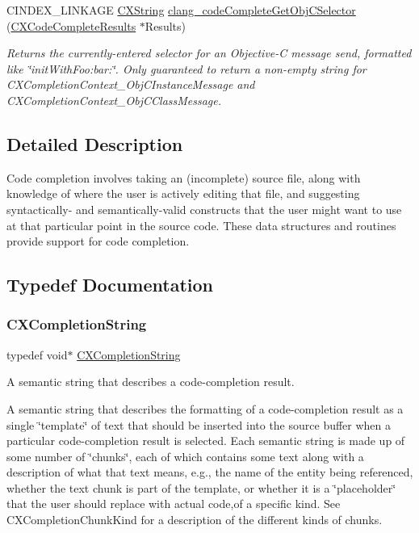 \begin{DoxyCompactItemize}
C\+I\+N\+D\+E\+X\+\_\+\+L\+I\+N\+K\+A\+GE \hyperlink{structCXString}{C\+X\+String} \hyperlink{group__CINDEX__CODE__COMPLET_gad03e82d61a1e6cdb78538bf61823aa11}{clang\+\_\+code\+Complete\+Get\+Obj\+C\+Selector} (\hyperlink{structCXCodeCompleteResults}{C\+X\+Code\+Complete\+Results} $\ast$Results)
\begin{DoxyCompactList}\small\item\em Returns the currently-\/entered selector for an Objective-\/C message send, formatted like \char`\"{}init\+With\+Foo\+:bar\+:\char`\"{}. Only guaranteed to return a non-\/empty string for C\+X\+Completion\+Context\+\_\+\+Obj\+C\+Instance\+Message and C\+X\+Completion\+Context\+\_\+\+Obj\+C\+Class\+Message. \end{DoxyCompactList}\end{DoxyCompactItemize}


\subsection{Detailed Description}
Code completion involves taking an (incomplete) source file, along with knowledge of where the user is actively editing that file, and suggesting syntactically-\/ and semantically-\/valid constructs that the user might want to use at that particular point in the source code. These data structures and routines provide support for code completion. 

\subsection{Typedef Documentation}
\mbox{\label{group__CINDEX__CODE__COMPLET_gafea23a43a60ec3b4f3bedccfbb76883a}} 
\subsubsection{\texorpdfstring{C\+X\+Completion\+String}{CXCompletionString}}
{\footnotesize\ttfamily typedef void$\ast$ \hyperlink{group__CINDEX__CODE__COMPLET_gafea23a43a60ec3b4f3bedccfbb76883a}{C\+X\+Completion\+String}}



A semantic string that describes a code-\/completion result. 

A semantic string that describes the formatting of a code-\/completion result as a single \char`\"{}template\char`\"{} of text that should be inserted into the source buffer when a particular code-\/completion result is selected. Each semantic string is made up of some number of \char`\"{}chunks\char`\"{}, each of which contains some text along with a description of what that text means, e.\+g., the name of the entity being referenced, whether the text chunk is part of the template, or whether it is a \char`\"{}placeholder\char`\"{} that the user should replace with actual code,of a specific kind. See {\ttfamily C\+X\+Completion\+Chunk\+Kind} for a description of the different kinds of chunks. 

